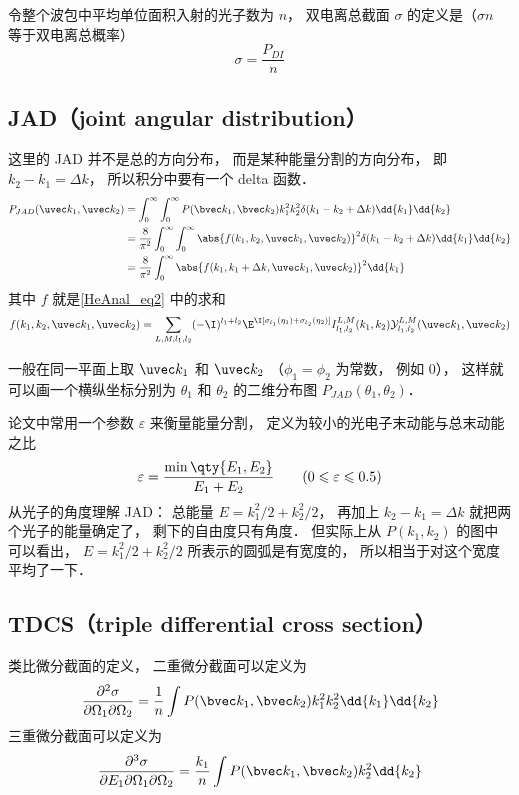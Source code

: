 令整个波包中平均单位面积入射的光子数为 $n$， 双电离总截面 $\sigma$ 的定义是（$\sigma n$ 等于双电离总概率）
\begin{equation}
\sigma = \frac{P_{DI}}{n}
\end{equation}

\subsection{JAD（joint angular distribution）}
这里的 JAD 并不是总的方向分布， 而是某种能量分割的方向分布， 即 $k_2 - k_1 = \Delta k$， 所以积分中要有一个 delta 函数．
\begin{equation}
\begin{aligned}
P_{JAD}(\uvec k_1, \uvec k_2) &= \int_0^\infty \int_0^\infty P(\bvec k_1, \bvec k_2) k_1^2 k_2^2 \delta(k_1 - k_2 + \Delta k) \dd{k_1} \dd{k_2}\\
&= \frac{8}{\pi^2}\int_0^\infty \int_0^\infty \abs{f(k_1, k_2, \uvec k_1, \uvec k_2)}^2 \delta(k_1 - k_2 + \Delta k) \dd{k_1} \dd{k_2}\\
&= \frac{8}{\pi^2} \int_0^\infty \abs{f(k_1, k_1 + \Delta k, \uvec k_1, \uvec k_2)}^2 \dd{k_1}
\end{aligned}
\end{equation}
其中 $f$ 就是\autoref{HeAnal_eq2} 中的求和
\begin{equation}
f(k_1, k_2, \uvec k_1, \uvec k_2) = \sum_{L, M, l_1, l_2} (-\I)^{l_1 + l_2} \E^{\I [\sigma_{l_1}(\eta_1) + \sigma_{l_2} (\eta_2)]}  I_{l_1, l_2}^{L, M}(k_1, k_2) \mathcal{Y}_{l_1, l_2}^{L, M}(\uvec k_1, \uvec k_2)
\end{equation}

一般在同一平面上取 $\uvec k_1$ 和 $\uvec k_2$ （$\phi_1 = \phi_2$ 为常数， 例如 0）， 这样就可以画一个横纵坐标分别为 $\theta_1$ 和 $\theta_2$ 的二维分布图 $P_{JAD}(\theta_1, \theta_2)$．

论文中常用一个参数 $\varepsilon$ 来衡量能量分割， 定义为较小的光电子末动能与总末动能之比
\begin{equation}
\varepsilon = \frac{\min\qty{E_1, E_2}}{E_1 + E_2} \qquad (0 \leqslant \varepsilon \leqslant 0.5)
\end{equation}
从光子的角度理解 JAD： 总能量 $E = k_1^2/2 + k_2^2/2$， 再加上 $k_2 - k_1 = \Delta k$ 就把两个光子的能量确定了， 剩下的自由度只有角度． 但实际上从 $P(k_1, k_2)$ 的图中可以看出， $E = k_1^2/2 + k_2^2/2$ 所表示的圆弧是有宽度的， 所以相当于对这个宽度平均了一下．

\subsection{TDCS（triple differential cross section）}
类比微分截面的定义， 二重微分截面可以定义为
\begin{equation}
\frac{\partial^2\sigma}{\partial\Omega_1\partial\Omega_2} = \frac{1}{n} \int P(\bvec k_1, \bvec k_2)k_1^2k_2^2\dd{k_1}\dd{k_2}
\end{equation}
三重微分截面可以定义为
\begin{equation}
\frac{\partial^3\sigma}{\partial E_1\partial\Omega_1\partial\Omega_2} = \frac{k_1}{n} \int P(\bvec k_1, \bvec k_2)k_2^2\dd{k_2}
\end{equation}

